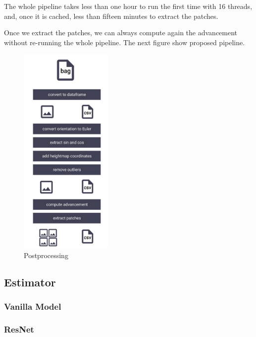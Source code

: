 \documentclass[../document.tex]{subfiles}
\begin{document}
The whole pipeline takes less than one hour to run the first time with 16 threads, and, once it is cached, less than fifteen minutes to extract the patches. 

Once we extract the patches, we can always compute again the advancement without re-running the whole pipeline. The next figure show proposed pipeline.
\begin{figure}[H] 
\centering
\includegraphics[width=0.4\textwidth]{../img/postprocessing-pipeline.jpg}
\caption{Postprocessing}
\label{fig: postprocessing-pipeline}
\end{figure}
\subsection{Estimator}

\subsubsection{Vanilla Model}
\subsubsection{ResNet}
\end{document}

